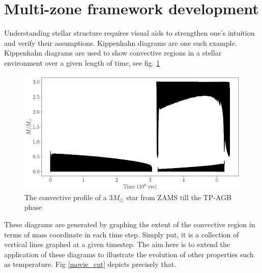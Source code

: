 \documentclass{article}
\begin{document}
\section*{Multi-zone framework development}

Understanding stellar structure requires visual aids to strengthen one's intuition and verify their assumptions. Kippenhahn diagrams 
are one such example. Kippenhahn diagrams are used to show convective regions in a stellar environment over a given length of time, see
fig. \ref{conv}

\begin{figure}[H]
    \centerline{\includegraphics[scale = 0.5]{images/conv.png}}
    \caption{The convective profile of a 3$M_{\odot}$ star from ZAMS till the TP-AGB phase}
    \label{conv}
\end{figure}

These diagrams are generated by graphing the extent of the convective region in terms of mass coordinate in each time step. Simply 
put, it is a collection of vertical lines graphed at a given timestep. The aim here is to extend the application of these diagrams 
to illustrate the evolution of other properties such as temperature. Fig \ref{movie_cut} depicts precisely that.
\end{document}
